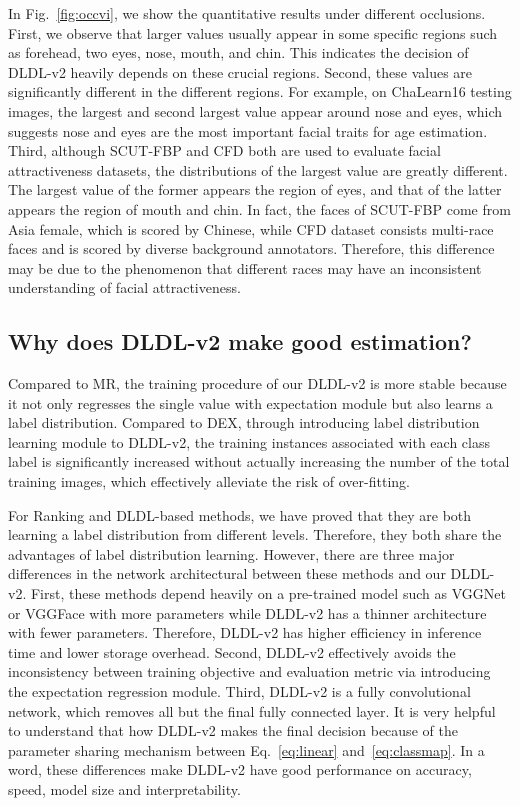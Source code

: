 \documentclass[5p,times,twocolumn]{elsarticle}
\begin{document}
In Fig.~\ref{fig:occvi}, we show the quantitative results under different occlusions. First, we observe that larger values usually appear in some specific regions such as forehead, two eyes, nose, mouth, and chin. This indicates the decision of DLDL-v2 heavily depends on these crucial regions. Second, these values are significantly different in the different regions. For example, on ChaLearn16 testing images, the largest and second largest value appear around nose and eyes, which suggests nose and eyes are the most important facial traits for age estimation. Third, although SCUT-FBP and CFD both are used to evaluate facial attractiveness datasets, the distributions of the largest value are greatly different. The largest value of the former appears the region of eyes, and that of the latter appears the region of mouth and chin. In fact, the faces of SCUT-FBP come from Asia female, which is scored by Chinese, while CFD dataset consists multi-race faces and is scored by diverse background annotators. Therefore, this difference may be due to the phenomenon that different races may have an inconsistent understanding of facial attractiveness.



\subsection{Why does DLDL-v2 make good estimation?}
Compared to MR, the training procedure of our DLDL-v2 is more stable because it not only regresses the single value with expectation module but also learns a label distribution. Compared to DEX, through introducing label distribution learning module to DLDL-v2, the training instances associated with each class label is significantly increased without actually increasing the number of the total training images, which effectively alleviate the risk of over-fitting. 

For Ranking and DLDL-based methods, we have proved that they are both learning a label distribution from different levels. Therefore, they both share the advantages of label distribution learning. However, there are three major differences in the network architectural between these methods
and our DLDL-v2. First, these methods depend heavily on a pre-trained model such as VGGNet or VGGFace with more parameters while DLDL-v2 has a thinner architecture with fewer parameters. Therefore, DLDL-v2 has higher efficiency in inference time and lower storage overhead. Second, DLDL-v2 effectively avoids the inconsistency between training objective and evaluation metric via introducing the expectation regression module. Third, DLDL-v2 is a fully convolutional network, which removes all but the final fully connected layer. It is very helpful to understand that how DLDL-v2 makes the final decision {because of the parameter sharing mechanism between Eq.~\ref{eq:linear} and~\ref{eq:classmap}.} In a word, these differences make DLDL-v2 have good performance on accuracy, speed, model size and interpretability.
\end{document}

